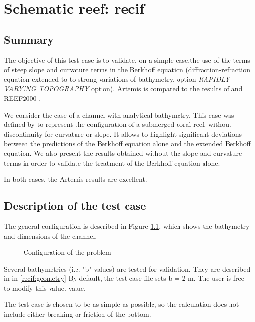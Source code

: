 \chapter{Schematic reef: recif}

\section{Summary}

The objective of this test case is to validate, on a simple case,the use of the terms of
steep slope 
and curvature terms in the Berkhoff equation (diffraction-refraction equation extended to
to strong variations of bathymetry, option {\it RAPIDLY VARYING TOPOGRAPHY} option).
Artemis is compared to the results of \cite{Massel1993} and REEF2000 \cite{Michel1999}.

We consider the case of a channel with analytical bathymetry. This case was defined by
\cite{Massel1993} to represent the configuration of a submerged coral reef, without discontinuity
for curvature or slope. It allows to highlight significant deviations between the
predictions of the Berkhoff equation alone and the extended Berkhoff equation.
We also present the results obtained without the slope and curvature terms in order to
validate the treatment of the Berkhoff equation alone.

In both cases, the Artemis results are excellent.

\section{Description of the test case}

The general configuration is described in Figure \ref{fig:recif_config}, which shows the bathymetry and dimensions of the
channel.

\begin{figure}[h]
\begin{center}
\end{center}
\caption{Configuration of the problem}
\label{fig:recif_config}
\end{figure}

Several bathymetries (i.e. "b" values) are tested for validation. They are described in
in \ref{recif:geometry} By default, the test case file sets b = 2 m. The user is free to modify this value.
value.

The test case is chosen to be as simple as possible, so the calculation does not include either breaking or
friction of the bottom.


